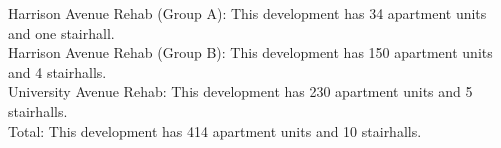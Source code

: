 {Harrison Avenue Rehab (Group A)}: This development has 34 apartment units and one stairhall.\\{Harrison Avenue Rehab (Group B)}: This development has 150 apartment units and 4 stairhalls.\\{University Avenue Rehab}: This development has 230 apartment units and 5 stairhalls.\\{Total}: This development has 414 apartment units and 10 stairhalls.\\